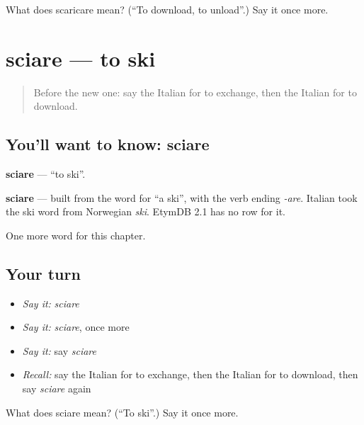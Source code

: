 \begin{tcolorbox}[breakable,colback=teal!4,colframe=teal!35!black,title={Before you move on}]
What does scaricare mean? (\textquotedblleft{}To download, to unload\textquotedblright{}.) Say it once more.
\end{tcolorbox}
\section[sciare]{sciare — to ski}

\label{lesson:IT-C150-sciare}



\begin{quote}
Before the new one: say the Italian for to exchange, then the Italian for to download.
\end{quote}

\subsection*{You'll want to know: sciare}
\textbf{sciare} — \textquotedblleft{}to ski\textquotedblright{}.

\begin{cousinweb}
\textbf{sciare} — built from the word for \textquotedblleft{}a ski\textquotedblright{}, with the verb ending \emph{-are}. Italian took the ski word from Norwegian \emph{ski}. EtymDB 2.1 has no row for it.
\end{cousinweb}

\begin{grammarlens}[title={What you've built}]
One more word for this chapter.
\end{grammarlens}

\subsection*{Your turn}
\begin{itemize}
\raggedright
  \item \emph{Say it:} \emph{sciare}
  \item \emph{Say it:} \emph{sciare}, once more
  \item \emph{Say it:} say \emph{sciare}
  \item \emph{Recall:} say the Italian for to exchange, then the Italian for to download, then say \emph{sciare} again
\end{itemize}

\begin{tcolorbox}[breakable,colback=teal!4,colframe=teal!35!black,title={Before you move on}]
What does sciare mean? (\textquotedblleft{}To ski\textquotedblright{}.) Say it once more.
\end{tcolorbox}
